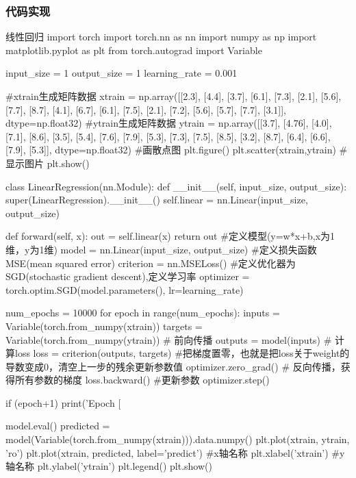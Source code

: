 \documentclass[openbib]{article}
\begin{document}
\subsubsection{代码实现}
	\begin{Python}{线性回归}
import torch
import torch.nn as nn
import numpy as np
import matplotlib.pyplot as plt
from torch.autograd import Variable

input_size = 1
output_size = 1
learning_rate = 0.001

#xtrain生成矩阵数据
xtrain = np.array([[2.3], [4.4], [3.7], [6.1], [7.3], [2.1], [5.6], [7.7], [8.7], [4.1], [6.7], [6.1], [7.5], [2.1],
[7.2], [5.6], [5.7], [7.7], [3.1]], dtype=np.float32)
#ytrain生成矩阵数据
ytrain = np.array([[3.7], [4.76], [4.0], [7.1], [8.6], [3.5], [5.4], [7.6], [7.9], [5.3], [7.3], [7.5], [8.5], [3.2],
[8.7], [6.4], [6.6], [7.9], [5.3]], dtype=np.float32)
#画散点图
plt.figure()
plt.scatter(xtrain,ytrain)
#显示图片
plt.show()

class  LinearRegression(nn.Module):
	def __init__(self, input_size, output_size):
		super(LinearRegression).__init__()
		self.linear = nn.Linear(input_size, output_size)

	def forward(self, x):
		out = self.linear(x)
		return out
#定义模型(y=w*x+b,x为1维，y为1维)
model = nn.Linear(input_size, output_size)
#定义损失函数MSE(mean squared error)
criterion = nn.MSELoss()
#定义优化器为SGD(stochastic gradient descent),定义学习率
optimizer = torch.optim.SGD(model.parameters(), lr=learning_rate)

num_epochs = 10000
for epoch in range(num_epochs):
	inputs = Variable(torch.from_numpy(xtrain))
	targets = Variable(torch.from_numpy(ytrain))
# 前向传播
	outputs = model(inputs)
# 计算loss
	loss = criterion(outputs, targets)
#把梯度置零，也就是把loss关于weight的导数变成0，清空上一步的残余更新参数值
	optimizer.zero_grad()
# 反向传播，获得所有参数的梯度
	loss.backward()
#更新参数
	optimizer.step()

if  (epoch+1) %
	print('Epoch [%

model.eval()
predicted = model(Variable(torch.from_numpy(xtrain))).data.numpy()
plt.plot(xtrain, ytrain, 'ro')
plt.plot(xtrain, predicted, label='predict')
#x轴名称
plt.xlabel('xtrain')
#y轴名称
plt.ylabel('ytrain')
plt.legend()
plt.show()

	\end{Python}
\end{document}
